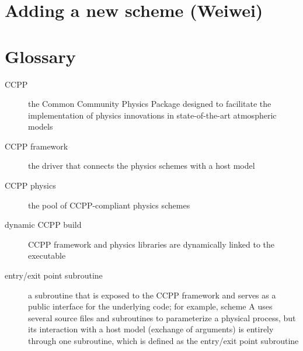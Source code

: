 \documentclass[letterpaper,10pt,english]{sphinxmanual}
\begin{document}
\chapter{Adding a new scheme (Weiwei)}
\label{\detokenize{AddingNewSchemes:adding-a-new-scheme-weiwei}}\label{\detokenize{AddingNewSchemes:addnewschemes}}\label{\detokenize{AddingNewSchemes::doc}}

\chapter{Glossary}
\label{\detokenize{Glossary:glossary}}\label{\detokenize{Glossary::doc}}\begin{description}
\item[{CCPP\label{\detokenize{Glossary:term-ccpp}}}] \leavevmode
the Common Community Physics Package designed to facilitate the implementation of
physics innovations in state-of-the-art atmospheric models

\item[{CCPP framework\label{\detokenize{Glossary:term-ccpp-framework}}}] \leavevmode
the driver that connects the physics schemes with a host model

\item[{CCPP physics\label{\detokenize{Glossary:term-ccpp-physics}}}] \leavevmode
the pool of CCPP-compliant physics schemes

\item[{dynamic CCPP build\label{\detokenize{Glossary:term-dynamic-ccpp-build}}}] \leavevmode
CCPP framework and physics libraries are dynamically linked to the executable

\item[{entry/exit point subroutine\label{\detokenize{Glossary:term-entry-exit-point-subroutine}}}] \leavevmode
a subroutine that is exposed to the CCPP framework and serves as a public interface for the
underlying code; for example, scheme A uses several source files and subroutines to parameterize
a physical process, but its interaction with a host model (exchange of arguments) is entirely
through one subroutine, which is defined as the entry/exit point subroutine


\end{description}
\end{document}
